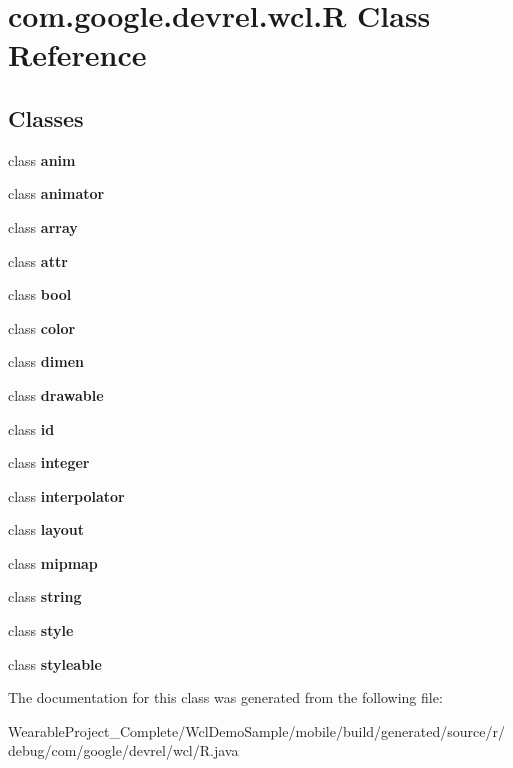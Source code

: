 \hypertarget{classcom_1_1google_1_1devrel_1_1wcl_1_1R}{}\section{com.\+google.\+devrel.\+wcl.\+R Class Reference}
\label{classcom_1_1google_1_1devrel_1_1wcl_1_1R}
\subsection*{Classes}
\begin{DoxyCompactItemize}
\item 
class {\bfseries anim}
\item 
class {\bfseries animator}
\item 
class {\bfseries array}
\item 
class {\bfseries attr}
\item 
class {\bfseries bool}
\item 
class {\bfseries color}
\item 
class {\bfseries dimen}
\item 
class {\bfseries drawable}
\item 
class {\bfseries id}
\item 
class {\bfseries integer}
\item 
class {\bfseries interpolator}
\item 
class {\bfseries layout}
\item 
class {\bfseries mipmap}
\item 
class {\bfseries string}
\item 
class {\bfseries style}
\item 
class {\bfseries styleable}
\end{DoxyCompactItemize}


The documentation for this class was generated from the following file\+:\begin{DoxyCompactItemize}
\item 
Wearable\+Project\+\_\+\+Complete/\+Wcl\+Demo\+Sample/mobile/build/generated/source/r/debug/com/google/devrel/wcl/R.\+java\end{DoxyCompactItemize}
